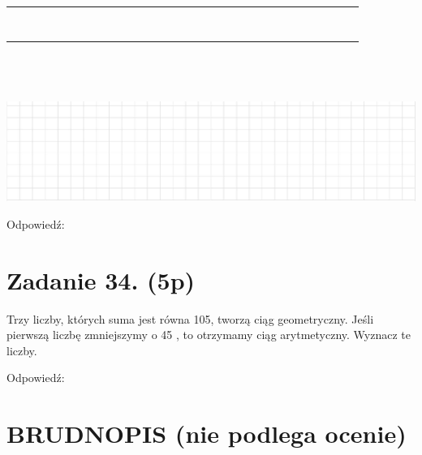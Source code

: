 \documentclass[10pt]{article}
\begin{document}
\begin{center}
\begin{tabular}{|c|c|c|c|c|c|c|c|c|c|c|c|c|c|c|c|c|c|c|c|c|c|c|c|c|c|c|c|c|c|c|}
\hline
 &  &  &  &  &  &  &  &  &  &  &  &  &  &  &  &  &  &  &  &  &  &  &  &  &  &  &  &  &  &  \\
\hline
 &  &  &  &  &  &  &  &  &  &  &  &  &  &  &  &  &  &  &  &  &  &  &  &  &  &  &  &  &  &  \\
\hline
 &  &  &  &  &  &  &  &  &  &  &  &  &  &  &  &  &  &  &  &  &  &  &  &  &  &  &  &  &  &  \\
\hline
 &  &  &  &  &  &  &  &  &  &  &  &  &  &  &  &  &  &  &  &  &  &  &  &  &  &  &  &  &  &  \\
\hline
 &  &  &  &  &  &  &  &  &  &  &  &  &  &  &  &  &  &  &  &  &  &  &  &  &  &  &  &  &  &  \\
\hline
 &  &  &  &  &  &  &  &  &  &  &  &  &  &  &  &  &  &  &  &  &  &  &  &  &  &  &  &  &  &  \\
\hline
 &  &  &  &  &  &  &  &  &  &  &  &  &  &  &  &  &  &  &  &  &  &  &  &  &  &  &  &  &  &  \\
\hline
 &  &  &  &  &  &  &  &  &  &  &  &  &  &  &  &  &  &  &  &  &  &  &  &  &  &  &  &  &  &  \\
\hline
 &  &  &  &  &  &  &  &  &  &  &  &  &  &  &  &  &  &  &  &  &  &  &  &  &  &  &  &  &  &  \\
\hline
\end{tabular}
\end{center}

\(\qquad\)\\
\(\qquad\)\\
\(\qquad\)\\
\includegraphics[max width=\textwidth, center]{2024_11_21_fb7e622176e162773107g-12}

Odpowiedź:

\section*{Zadanie 34. (5p)}
Trzy liczby, których suma jest równa 105, tworzą ciąg geometryczny. Jeśli pierwszą liczbę zmniejszymy o 45 , to otrzymamy ciąg arytmetyczny. Wyznacz te liczby.

Odpowiedź:

\section*{BRUDNOPIS (nie podlega ocenie)}
\end{document}
